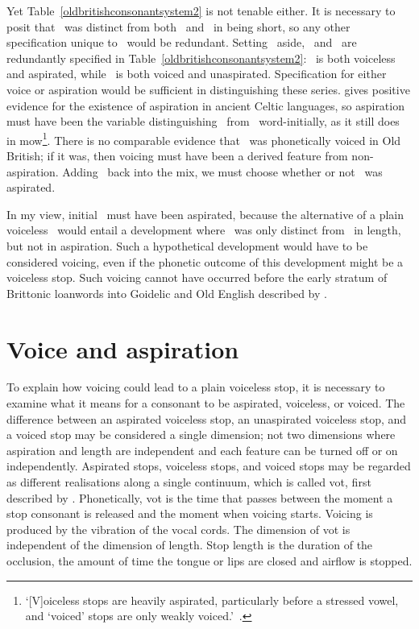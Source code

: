 Yet Table~\ref{oldbritishconsonantsystem2} is not tenable either. It is necessary to posit that \lT\ was distinct from both \xT\ and \xD\ in being short, so any other specification unique to \lT\ would be redundant. Setting \lT\ aside, \xT\ and \xD\ are redundantly specified in Table~\ref{oldbritishconsonantsystem2}: \xT\ is both voiceless and aspirated, while \xD\ is both voiced and unaspirated. Specification for either voice or aspiration would be sufficient in distinguishing these series. \Textcite{koch_*cothairche_1990} gives positive evidence for the existence of aspiration in ancient Celtic languages, so aspiration must have been the variable distinguishing \xT\ from \xD\ word-initially, as it still does in \gls{mow}\footnote{`[V]oiceless stops are heavily aspirated,
particularly before a stressed vowel, and ‘voiced’ stops are only weakly voiced.'~\autocite[368]{Awb_Welsh09}.}. There is no comparable evidence that \xD\ was phonetically voiced in Old British; if it was, then voicing must have been a derived feature from non-aspiration. Adding \lT\ back into the mix, we must choose whether or not \lT\ was aspirated.

In my view, initial \lT\ must have been aspirated, because the alternative of a plain voiceless \lT\ would entail a development where \lT\ was only distinct from \xD\ in length, but not in aspiration. Such a hypothetical development would have to be considered voicing, even if the phonetic outcome of this development might be a voiceless stop. Such voicing cannot have occurred before the early stratum of Brittonic loanwords into Goidelic and Old English described by \textcite{koch_*cothairche_1990}.

\section{Voice and aspiration}
\label{sec:voice-aspiration}
To explain how voicing could lead to a plain voiceless stop, it is necessary to examine what it means for a consonant to be aspirated, voiceless, or voiced. The difference between an aspirated voiceless stop, an unaspirated voiceless stop, and a voiced stop may be considered a single dimension; not two dimensions where aspiration and length are independent and each feature can be turned off or on independently. Aspirated stops, voiceless stops, and voiced stops may be regarded as different realisations along a  single continuum, which is called \gls{vot}, first described by \textcite{LA_CrossLanguage64}. Phonetically, \gls{vot} is the time that passes between the moment a stop consonant is released and the moment when voicing starts. Voicing is produced by the vibration of the vocal cords. The dimension of \gls{vot} is independent of the dimension of length. Stop length is the duration of the occlusion, \ie the amount of time the tongue or lips are closed and airflow is stopped. 

